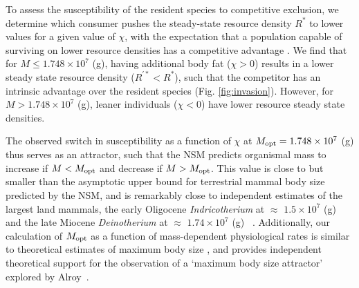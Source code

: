 \documentclass[twocolumn,preprintnumbers,amsmath,amssymb,superscriptaddress]{revtex4}
\begin{document}
To assess the susceptibility of the resident species to competitive
exclusion, we determine which consumer pushes the steady-state resource
density $R^*$ to lower values for a given value of $\chi$, with the
expectation that a population capable of surviving on lower resource
densities has a competitive advantage \citep{tilman1981}.  We find that for
$M\leq 1.748\times10^7$ (g), having additional body fat ($\chi > 0$) results
in a lower steady state resource density ($R^{\prime *}<R^*$), such that the
competitor has an intrinsic advantage over the resident species
(Fig. \ref{fig:invasion}).  However, for $M> 1.748\times10^7$ (g), leaner
individuals ($\chi < 0$) have lower resource steady state densities.


The observed switch in susceptibility as a function of $\chi$ at
$M_{\rm opt}= 1.748\times10^7$ (g) thus serves as an attractor, such that the
NSM predicts organismal mass to increase if $M<M_{\rm opt}$ and decrease if
$M>M_{\rm opt}$.  This value is close to but smaller than the asymptotic
upper bound for terrestrial mammal body size predicted by the NSM, and is remarkably close to independent estimates of the largest land
mammals, the early Oligocene \emph{Indricotherium} at $\approx$
$1.5\times10^7$ (g) and the late Miocene \emph{Deinotherium} at $\approx$
$1.74\times10^7$ (g) ~\citep{Smith:2010p3442}.  Additionally, our calculation
of $M_{\rm opt}$ as a function of mass-dependent physiological rates is
similar to theoretical estimates of maximum body size \citep{Clauset:2009fh},
and provides independent theoretical support for the observation of a
`maximum body size attractor' explored by Alroy~\citep{Alroy:1998p1594}.
\end{document}
